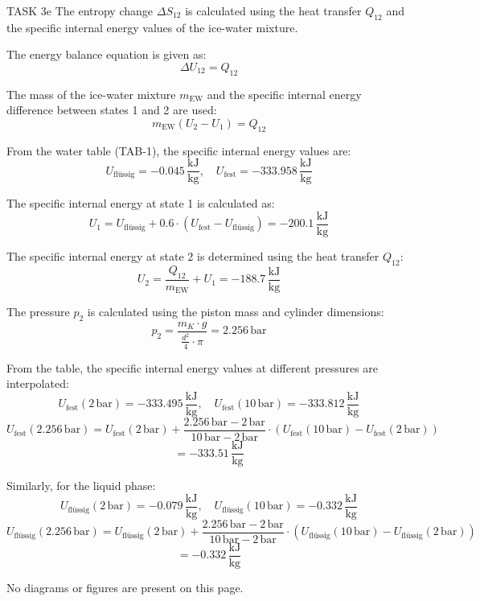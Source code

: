 TASK 3e  
The entropy change \( \Delta S_{12} \) is calculated using the heat transfer \( Q_{12} \) and the specific internal energy values of the ice-water mixture.  

The energy balance equation is given as:  
\[
\Delta U_{12} = Q_{12}
\]  

The mass of the ice-water mixture \( m_{\text{EW}} \) and the specific internal energy difference between states 1 and 2 are used:  
\[
m_{\text{EW}} (U_2 - U_1) = Q_{12}
\]  

From the water table (TAB-1), the specific internal energy values are:  
\[
U_{\text{flüssig}} = -0.045 \, \frac{\text{kJ}}{\text{kg}}, \quad U_{\text{fest}} = -333.958 \, \frac{\text{kJ}}{\text{kg}}
\]  

The specific internal energy at state 1 is calculated as:  
\[
U_1 = U_{\text{flüssig}} + 0.6 \cdot (U_{\text{fest}} - U_{\text{flüssig}}) = -200.1 \, \frac{\text{kJ}}{\text{kg}}
\]  

The specific internal energy at state 2 is determined using the heat transfer \( Q_{12} \):  
\[
U_2 = \frac{Q_{12}}{m_{\text{EW}}} + U_1 = -188.7 \, \frac{\text{kJ}}{\text{kg}}
\]  

The pressure \( p_2 \) is calculated using the piston mass and cylinder dimensions:  
\[
p_2 = \frac{m_K \cdot g}{\frac{d^2}{4} \cdot \pi} = 2.256 \, \text{bar}
\]  

From the table, the specific internal energy values at different pressures are interpolated:  
\[
U_{\text{fest}} (2 \, \text{bar}) = -333.495 \, \frac{\text{kJ}}{\text{kg}}, \quad U_{\text{fest}} (10 \, \text{bar}) = -333.812 \, \frac{\text{kJ}}{\text{kg}}
\]  
\[
U_{\text{fest}} (2.256 \, \text{bar}) = U_{\text{fest}} (2 \, \text{bar}) + \frac{2.256 \, \text{bar} - 2 \, \text{bar}}{10 \, \text{bar} - 2 \, \text{bar}} \cdot (U_{\text{fest}} (10 \, \text{bar}) - U_{\text{fest}} (2 \, \text{bar}))
\]  
\[
= -333.51 \, \frac{\text{kJ}}{\text{kg}}
\]  

Similarly, for the liquid phase:  
\[
U_{\text{flüssig}} (2 \, \text{bar}) = -0.079 \, \frac{\text{kJ}}{\text{kg}}, \quad U_{\text{flüssig}} (10 \, \text{bar}) = -0.332 \, \frac{\text{kJ}}{\text{kg}}
\]  
\[
U_{\text{flüssig}} (2.256 \, \text{bar}) = U_{\text{flüssig}} (2 \, \text{bar}) + \frac{2.256 \, \text{bar} - 2 \, \text{bar}}{10 \, \text{bar} - 2 \, \text{bar}} \cdot (U_{\text{flüssig}} (10 \, \text{bar}) - U_{\text{flüssig}} (2 \, \text{bar}))
\]  
\[
= -0.332 \, \frac{\text{kJ}}{\text{kg}}
\]  

No diagrams or figures are present on this page.